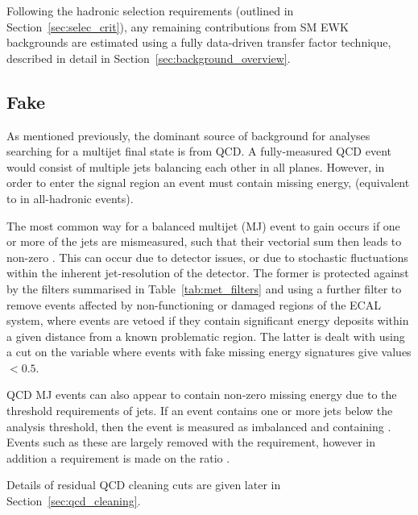 
Following the hadronic selection requirements (outlined in
Section~\ref{sec:selec_crit}),
any remaining contributions from SM EWK backgrounds are estimated using a 
fully data-driven transfer factor technique, described in detail in
Section~\ref{sec:background_overview}.

\subsection{Fake \met}

As mentioned previously, the dominant source of background for analyses 
searching for a multijet final state is from QCD. A fully-measured QCD event 
would consist of multiple jets balancing each other in all planes. However, in 
order to enter the signal region an event must contain missing energy, 
\mht (equivalent to \met in all-hadronic events).

The most common way for a balanced multijet (MJ) event to gain \mht occurs if
one
or more of the jets are mismeasured, such that their vectorial sum then leads to non-zero
\mht. This can occur due to detector issues, or due to stochastic fluctuations
within the inherent jet-resolution of the 
detector. The former is protected against by the \met filters summarised in 
Table~\ref{tab:met_filters} and using a further filter to remove events
affected by non-functioning or damaged regions of the ECAL system, where 
events are vetoed if they contain significant energy deposits within a given 
distance from a known problematic region. The latter is dealt with using a
cut on the \alphat variable where 
events with fake missing energy signatures give values $<0.5$.

QCD MJ events can also appear to contain non-zero missing energy 
due to the threshold requirements of jets. If an event contains 
one or more jets below the analysis threshold, then the 
event is measured as imbalanced and containing \mht. Events such as these are largely 
removed with the \alphat requirement, however in addition a requirement is made on the
ratio \mhtmet.

Details of residual QCD cleaning cuts are given later in
Section~\ref{sec:qcd_cleaning}.



